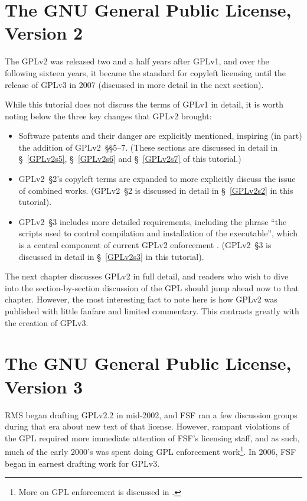 \section{The GNU General Public License, Version 2}

The GPLv2 was released two and a half years after GPLv1, and over the
following sixteen years, it became the standard for copyleft licensing until
the release of GPLv3 in 2007 (discussed in more detail in the next section).

While this tutorial does not discuss the terms of GPLv1 in detail, it is
worth noting below the three key changes that GPLv2 brought:

\begin{itemize}

\item Software patents and their danger are explicitly mentioned, inspiring
  (in part) the addition of GPLv2~\S\S5--7.  (These sections are discussed in
  detail in \S~\ref{GPLv2s5}, \S~\ref{GPLv2s6} and \S~\ref{GPLv2s7} of this
  tutorial.)

\item GPLv2~\S2's copyleft terms are expanded to more explicitly discuss the
  issue of combined works.  (GPLv2~\S2 is discussed in detail in
  \S~\ref{GPLv2s2} in this tutorial).

\item GPLv2~\S3 includes more detailed requirements, including the phrase
 ``the scripts used to control compilation and installation of the
  executable'', which is a central component of current GPLv2 enforcement
  .  (GPLv2~\S3 is discussed in detail in
  \S~\ref{GPLv2s3} in this tutorial).
\end{itemize}

The next chapter discusses GPLv2 in full detail, and readers who wish to dive
into the section-by-section discussion of the GPL should jump ahead now to
that chapter.  However, the most interesting fact to note here is how GPLv2
was published with little fanfare and limited commentary.  This contrasts
greatly with the creation of GPLv3.

\section{The GNU General Public License, Version 3}

RMS began drafting GPLv2.2 in mid-2002, and FSF ran a few discussion groups
during that era about new text of that license.  However, rampant violations
of the GPL required more immediate attention of FSF's licensing staff, and as
such, much of the early 2000's was spent doing GPL enforcement
work\footnote{More on GPL enforcement is discussed in .}.  In
2006, FSF began in earnest drafting work for GPLv3.

